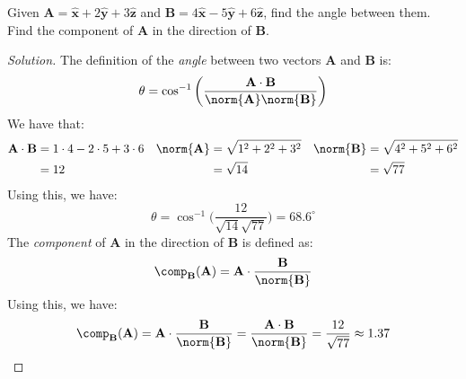 \documentclass[crop=false,class=article,oneside]{standalone}
\begin{document}
        \begin{problem}[Wangsness 1-4]
            Given
            $\mathbf{A}%
             =\hat{\mathbf{x}}+2\hat{\mathbf{y}}%
             +3\hat{\mathbf{z}}$
            and
            $\mathbf{B}%
             =4\hat{\mathbf{x}}-5\hat{\mathbf{y}}%
             +6\hat{\mathbf{z}}$,
            find the angle between them. Find the component of
            $\mathbf{A}$ in the direction of $\mathbf{B}$.
        \end{problem}
        \begin{proof}[Solution]
            The definition of the \textit{angle}
            between two vectors
            $\mathbf{A}$ and $\mathbf{B}$ is:
            \begin{equation*}
                \theta=
                \cos^{-1}\bigg(
                    \frac{\mathbf{A}\cdot\mathbf{B}}
                    {\norm{\mathbf{A}}\norm{\mathbf{B}}}
                \bigg)
            \end{equation*}
            We have that:
            \begin{align*}
                \mathbf{A}\cdot\mathbf{B}
                &=1\cdot4-2\cdot5+3\cdot6
                &
                \norm{\mathbf{A}}
                &=\sqrt{1^{2}+2^{2}+3^{2}}
                &
                \norm{\mathbf{B}}
                &=\sqrt{4^{2}+5^{2}+6^{2}}\\
                &=12
                &
                &=\sqrt{14}
                &
                &=\sqrt{77}\\
            \end{align*}
            Using this, we have:
            \begin{equation*}
                \theta=\cos^{-1}\bigg(
                    \frac{12}{\sqrt{14}{\sqrt{77}}}
                \bigg)
                =68.6^{\circ}
            \end{equation*}
            The \textit{component} of $\mathbf{A}$
            in the direction of
            $\mathbf{B}$ is defined as:
            \begin{equation*}
                \comp_{\mathbf{B}}(\mathbf{A})
                =\mathbf{A}\cdot\frac{\mathbf{B}}
                    {\norm{\mathbf{B}}}
            \end{equation*}
            Using this, we have:
            \begin{equation*}
                \comp_{\mathbf{B}}(\mathbf{A})
                =\mathbf{A}\cdot\frac{\mathbf{B}}
                    {\norm{\mathbf{B}}}
                =\frac{\mathbf{A}
                    \cdot\mathbf{B}}{\norm{\mathbf{B}}}
                =\frac{12}{\sqrt{77}}
                \approx{1.37}
            \end{equation*}
        \end{proof}
\end{document}
